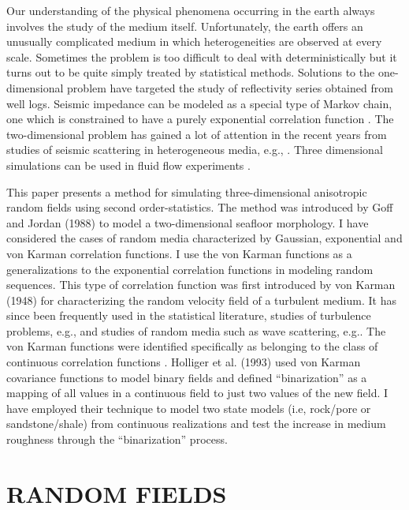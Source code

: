 Our understanding of the physical phenomena occurring in the earth always 
involves the study of the medium itself. Unfortunately, the earth offers
an unusually complicated medium in which heterogeneities are observed at every
scale. Sometimes the problem is too difficult to deal with deterministically
but it turns out to be quite simply treated by statistical methods. 
Solutions to the one-dimensional problem have targeted the study of reflectivity
series obtained from well logs. 
Seismic impedance can be modeled as a special type of Markov
chain, one which is constrained to have a purely exponential correlation
function \cite[]{Godfrey}. 
The two-dimensional problem has gained a lot of attention in the 
recent years from studies of seismic scattering in heterogeneous media, e.g.,  
\cite[]{Wu,Frankel,Goff,Holliger1,Holliger2}.  
Three dimensional simulations can 
be used in fluid flow experiments \cite[]{Popovici.sep.60.295}.\\ 
\par
This paper presents
a method for simulating three-dimensional anisotropic random fields 
using second order-statistics. The method was introduced by Goff and Jordan
(1988) to model a two-dimensional seafloor morphology. 
I have considered the cases of random media 
characterized by Gaussian, exponential and von Karman correlation functions.
I use the von Karman functions as a generalizations to the exponential 
correlation functions in modeling random sequences. 
This type of correlation function was first introduced by von Karman (1948)
for characterizing the random velocity field of a turbulent medium. It has 
since been frequently used in the statistical literature, studies
of turbulence problems, e.g.\cite[]{Tatarski},
and studies of random media such as wave scattering, e.g.\cite[]{Chernov}.
The von Karman functions were identified specifically as belonging to the
class of continuous correlation functions \cite[]{Matern}.
Holliger et al. (1993) used von Karman covariance functions to model binary
fields and defined ``binarization'' as a mapping of all values in
a continuous field to just two values of the new field.
I have employed their technique to model
two state models (i.e, rock/pore or sandstone/shale) from 
continuous realizations and test the
increase in medium roughness through the ``binarization'' process.
  
\section{RANDOM FIELDS}

